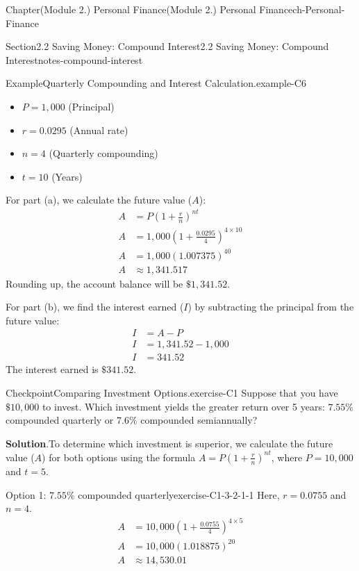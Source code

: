 \documentclass[oneside,10pt,]{book}
\newcommand{\blocktitlefont}{\relax}
\newcommand{\ptxlistdisc}{\raisebox{0.3ex}{\textbullet}}
\newcommand{\amp}{&}
\begin{document}
\begin{chapterptx}{Chapter}{(Module 2.) Personal Finance}{}{(Module 2.) Personal Finance}{}{}{ch-Personal-Finance}
\begin{sectionptx}{Section}{2.2 Saving Money: Compound Interest}{}{2.2 Saving Money: Compound Interest}{}{}{notes-compound-interest}
\begin{example}{Example}{Quarterly Compounding and Interest Calculation.}{example-C6}
\begin{itemize}[label=\ptxlistdisc]
\item{}\(P = 1,000\) (Principal)%
\item{}\(r = 0.0295\) (Annual rate)%
\item{}\(n = 4\) (Quarterly compounding)%
\item{}\(t = 10\) (Years)%
\end{itemize}
%
\par
For part (a), we calculate the future value (\(A\)):%
\begin{align*}
A \amp = P\left(1 + \frac{r}{n}\right)^{nt}\\
A \amp = 1,000\left(1 + \frac{0.0295}{4}\right)^{4 \times 10}\\
A \amp = 1,000(1.007375)^{40}\\
A \amp \approx 1,341.517
\end{align*}
Rounding up, the account balance will be \(\$1,341.52\).%
\par
For part (b), we find the interest earned (\(I\)) by subtracting the principal from the future value:%
\begin{align*}
I \amp = A - P\\
I \amp = 1,341.52 - 1,000\\
I \amp = 341.52
\end{align*}
The interest earned is \(\$341.52\).%
\end{example}
\begin{inlineexercise}{Checkpoint}{Comparing Investment Options.}{exercise-C1}%
Suppose that you have \(\$10,000\) to invest. Which investment yields the greater return over 5 years: \(7.55\%\) compounded quarterly or \(7.6\%\) compounded semiannually?%
\par\smallskip%
\noindent\textbf{\blocktitlefont Solution}.\hypertarget{exercise-C1-3}{}\quad{}To determine which investment is superior, we calculate the future value (\(A\)) for both options using the formula \(A = P(1 + \frac{r}{n})^{nt}\), where \(P = 10,000\) and \(t = 5\).%
\par
%
\begin{descriptionlist}
\begin{dlimedium}{Option 1: \(7.55\%\) compounded quarterly}{exercise-C1-3-2-1-1}%
Here, \(r = 0.0755\) and \(n = 4\).%
\begin{align*}
A \amp = 10,000\left(1 + \frac{0.0755}{4}\right)^{4 \times 5}\\
A \amp = 10,000(1.018875)^{20}\\
A \amp \approx 14,530.01

\end{align*}
\end{dlimedium}
\end{descriptionlist}
\end{inlineexercise}
\end{sectionptx}
\end{chapterptx}
\end{document}
